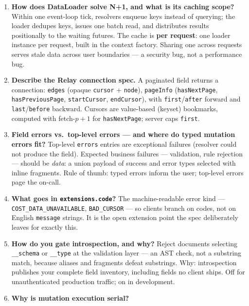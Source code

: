 \begin{enumerate}[label=\textbf{Q\arabic*.}, leftmargin=2.6em]
  \item \textbf{How does DataLoader solve N+1, and what is its caching
        scope?}
        Within one event-loop tick, resolvers enqueue keys instead of
        querying; the loader dedupes keys, issues one batch read, and
        distributes results positionally to the waiting futures. The
        cache is \textbf{per request}: one loader instance per request,
        built in the context factory. Sharing one across requests serves
        stale data across user boundaries --- a security bug, not a
        performance bug.
  \item \textbf{Describe the Relay connection spec.}
        A paginated field returns a connection: \texttt{edges}
        (opaque \texttt{cursor} + \texttt{node}), \texttt{pageInfo}
        (\texttt{hasNextPage}, \texttt{hasPreviousPage},
        \texttt{startCursor}, \texttt{endCursor}), with
        \texttt{first}/\texttt{after} forward and
        \texttt{last}/\texttt{before} backward. Cursors are value-based
        (keyset) bookmarks, computed with fetch-$p{+}1$ for
        \texttt{hasNextPage}; server caps \texttt{first}.
  \item \textbf{Field errors vs.\ top-level errors --- and where do typed
        mutation errors fit?}
        Top-level \texttt{errors} entries are exceptional failures
        (resolver could not produce the field). Expected business
        failures --- validation, rule rejection --- should be
        \emph{data}: a union payload of success and error types selected
        with inline fragments. Rule of thumb: typed errors inform the
        user; top-level errors page the on-call.
  \item \textbf{What goes in \texttt{extensions.code}?}
        The machine-readable error kind ---
        \texttt{COST\_DATA\_UNAVAILABLE}, \texttt{BAD\_CURSOR} --- so
        clients branch on codes, not on English \texttt{message} strings.
        It is the open extension point the spec deliberately leaves for
        exactly this.
  \item \textbf{How do you gate introspection, and why?}
        Reject documents selecting \texttt{\_\_schema} or
        \texttt{\_\_type} at the validation layer --- an AST check, not a
        substring match, because aliases and fragments defeat substrings.
        Why: introspection publishes your complete field inventory,
        including fields no client ships. Off for unauthenticated
        production traffic; on in development.
  \item \textbf{Why is mutation execution serial?}

\end{enumerate}
